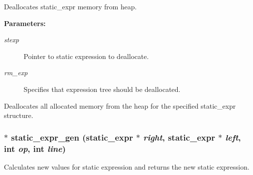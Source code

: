 Deallocates static\_\-expr memory from heap.

\begin{Desc}
\item[{\bf Parameters: }]\par
\begin{description}
\item[
{\em stexp}]Pointer to static expression to deallocate. \item[
{\em rm\_\-exp}]Specifies that expression tree should be deallocated.

\end{description}
\end{Desc}
Deallocates all allocated memory from the heap for the specified static\_\-expr structure. 
\subsubsection{ $\ast$ static\_\-expr\_\-gen ({\bf static\_\-expr} $\ast$ {\em right}, {\bf static\_\-expr} $\ast$ {\em left}, int {\em op}, int {\em line})}\label{static_8c_a1}


Calculates new values for static expression and returns the new static expression.

